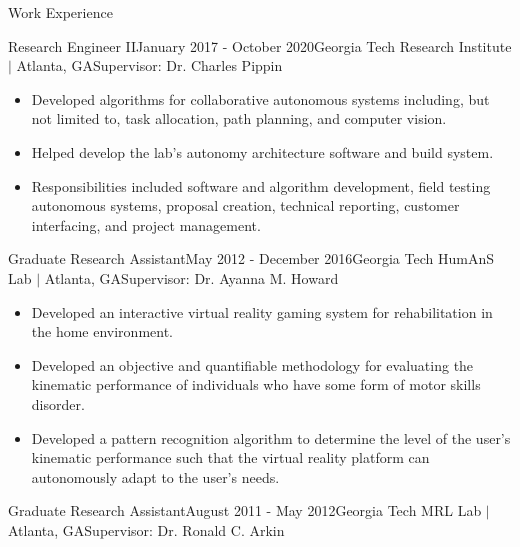 \documentclass{resume} %
\begin{document}
\begin{rSection}{Work Experience}
\begin{rSubsection}{Research Engineer II}{January 2017 - October 2020}{Georgia Tech Research Institute $\vert$ Atlanta, GA}{Supervisor: Dr. Charles Pippin}
\item
\begin{itemize}
\item Developed algorithms for collaborative autonomous systems including, but
  not limited to, task allocation, path planning, and computer vision.

\item Helped develop the lab’s autonomy architecture software and build system.

\item Responsibilities included software and algorithm development, field
  testing autonomous systems, proposal creation, technical reporting, customer
  interfacing, and project management.

\end{itemize}

\end{rSubsection}


\begin{rSubsection}{Graduate Research Assistant}{May 2012 - December 2016}{Georgia Tech HumAnS Lab $\vert$ Atlanta, GA}{Supervisor: Dr. Ayanna M. Howard}

\item
\begin{itemize}
\item Developed an interactive virtual reality gaming system for rehabilitation
  in the home environment.

\item Developed an objective and quantifiable methodology for evaluating the
  kinematic performance of individuals who have some form of motor skills
  disorder.

\item Developed a pattern recognition algorithm to determine the level of the
  user's kinematic performance such that the virtual reality platform can
  autonomously adapt to the user's needs.

\end{itemize}

\end{rSubsection}


\iffalse
\begin{rSubsection}{Graduate Research Assistant}{August 2011 - May 2012}{Georgia Tech MRL Lab $\vert$ Atlanta, GA}{Supervisor: Dr. Ronald C. Arkin}


\end{rSubsection}
\end{rSection}
\end{document}
